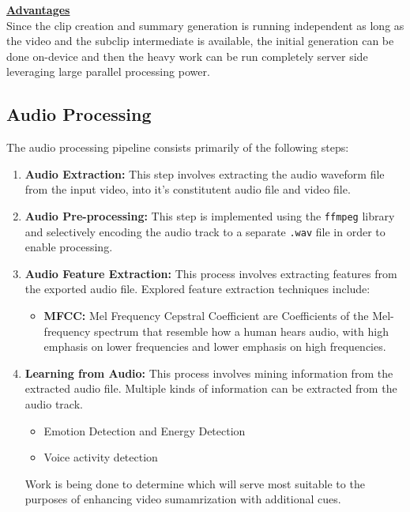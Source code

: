 			\begin{mdframed}
				\textbf{\underline{Advantages}}\\
					Since the clip creation and summary generation is running independent as long as the video and the subclip intermediate is available, the initial generation can be done on-device and then the heavy work can be run completely server side leveraging large parallel processing power.
			\end{mdframed}
	
	\subsection{Audio Processing}
	    The audio processing pipeline consists primarily of the following steps:
	    
	    \begin{enumerate}
	        \item \textbf{Audio Extraction:}
	            This step involves extracting the audio waveform file from the input video, into it's constitutent audio file and video file.
	        \item \textbf{Audio Pre-processing:}
	            This step is implemented using the \texttt{ffmpeg} library and selectively encoding the audio track to a separate \texttt{.wav} file in order to enable processing.
            \item \textbf{Audio Feature Extraction:}
                This process involves extracting features from the exported audio file. Explored feature extraction techniques include:
                \begin{itemize}
                    \item \textbf{MFCC:} Mel Frequency Cepstral Coefficient are Coefficients of the Mel-frequency spectrum that resemble how a human hears audio, with high emphasis on lower frequencies and lower emphasis on high frequencies.
                \end{itemize}
            \item \textbf{Learning from Audio:} This process involves mining information from the extracted audio file. Multiple kinds of information can be extracted from the audio track.
                \begin{itemize}
                    \item Emotion Detection and Energy Detection
                    \item Voice activity detection
                \end{itemize}
            Work is being done to determine which will serve most suitable to the purposes of enhancing video sumamrization with additional cues.
	    \end{enumerate}